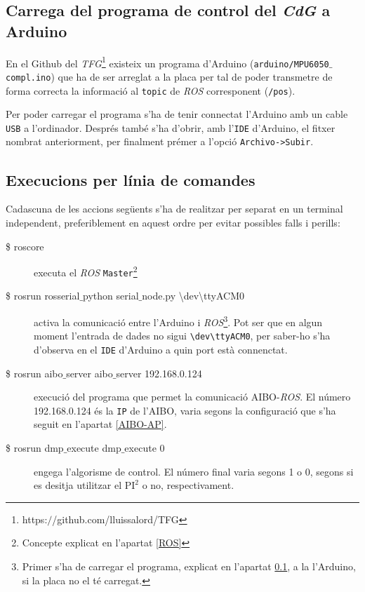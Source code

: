 \documentclass[12pt,a4paper,final,twoside]{report}
\begin{document}
\subsection{Carrega del programa de control del \textit{CdG} a Arduino}
\label{carregar-programa-Arduino}

En el Github del \textit{TFG}\footnote{https:$/$/github.com/lluissalord/TFG} existeix un programa d'Arduino (\texttt{arduino/MPU6050$\_$compl.ino}) que ha de ser arreglat a la placa per tal de poder transmetre de forma correcta la informació al \texttt{topic} de \textit{ROS} corresponent (\texttt{/pos}).

Per poder carregar el programa s'ha de tenir connectat l'Arduino amb un cable \texttt{USB} a l'ordinador. Després també s'ha d'obrir, amb l'\texttt{IDE} d'Arduino, el fitxer nombrat anteriorment, per finalment prémer a l'opció \texttt{Archivo->Subir}.

\subsection{Execucions per línia de comandes}

Cadascuna de les accions següents s'ha de realitzar per separat en un terminal independent, preferiblement en aquest ordre per evitar possibles falls i perills:

\begin{description}
\item[\$ roscore] executa el \textit{ROS} \texttt{Master}\footnote{Concepte explicat en l'apartat \ref{ROS}}

\item[\$ rosrun rosserial$\_$python serial$\_$node.py \textbackslash dev\textbackslash ttyACM0] activa la comunicació entre l'Arduino i \textit{ROS}\footnote{Primer s'ha de carregar el programa, explicat en l'apartat \ref{carregar-programa-Arduino}, a la l'Arduino, si la placa no el té carregat.}. Pot ser que en algun moment l'entrada de dades no sigui \texttt{\textbackslash dev\textbackslash ttyACM0}, per saber-ho s'ha d'observa en el \texttt{IDE} d'Arduino a quin port està connenctat.

\item[\$ rosrun aibo$\_$server aibo$\_$server 192.168.0.124] execució del programa que permet la comunicació AIBO-\textit{ROS}. El número 192.168.0.124 és la \texttt{IP} de l'AIBO, varia segons la configuració que s'ha seguit en l'apartat \ref{AIBO-AP}.

\item[\$ rosrun dmp$\_$execute dmp$\_$execute 0] engega l'algorisme de control. El número final varia segons 1 o 0, segons si es desitja utilitzar el $\mathrm{PI^2}$ o no, respectivament.
\end{description}
\end{document}
